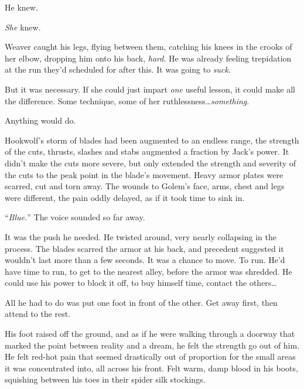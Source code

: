 He knew.



\emph{She} knew.



Weaver caught his legs, flying between them, catching his knees in the crooks of her elbow, dropping him onto his back, \emph{hard}.  He was already feeling trepidation at the run they'd scheduled for after this.  It was going to \emph{suck}.



But it was necessary.  If she could just impart \emph{one }useful lesson, it could make all the difference.  Some technique, some of her ruthlessness\ldots \emph{something}.



Anything would do.



\sectionbreak



Hookwolf's storm of blades had been augmented to an endless range, the strength of the cuts, thrusts, slashes and stabs augmented a fraction by Jack's power.  It didn't make the cuts more severe, but only extended the strength and severity of the cuts to the peak point in the blade's movement.  Heavy armor plates were scarred, cut and torn away.  The wounds to Golem's face, arms, chest and legs were different, the pain oddly delayed, as if it took time to sink in.



``\emph{Blue.}''  The voice sounded so far away.



It was the push he needed.  He twisted around, very nearly collapsing in the process.  The blades scarred the armor at his back, and precedent suggested it wouldn't last more than a few seconds.  It was a chance to move.  To run.  He'd have time to run, to get to the nearest alley, before the armor was shredded.  He could use his power to block it off, to buy himself time, contact the others\ldots



All he had to do was put one foot in front of the other.  Get away first, then attend to the rest.



His foot raised off the ground, and as if he were walking through a doorway that marked the point between reality and a dream, he felt the strength go out of him.  He felt red-hot pain that seemed drastically out of proportion for the small areas it was concentrated into, all across his front.  Felt warm, damp blood in his boots, squishing between his toes in their spider silk stockings.



